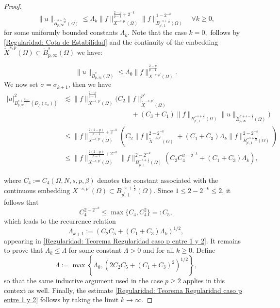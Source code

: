 \documentclass[]{amsart}
\theoremstyle{definition}
\theoremstyle{definition}
\theoremstyle{remark}
\numberwithin{equation}{section}
\begin{document}
\begin{proof}
		\begin{equation}
			\label{Regularidad: Teorema Regularidad caso p entre 1 y 2}
			\|u\|_{\dot{B}_{p, \infty}^{s+\frac{\sigma_{k}}{2}}(\Omega)} \leq \Lambda_{k}\|f\|_{X^{-s,p^{\prime}}(\Omega)}^{\frac{2-p}{p-1}+2^{-k}}\|f\|_{B_{p^{\prime}, 1}^{-s+\frac{1}{2}}(\Omega)}^{1-2^{-k}} \quad \forall k \ge 0,
		\end{equation}
		for some uniformly bounded constants \(\Lambda_{k}\).  Note that the case \(k=0,\) follows by \eqref{Regularidad: Cota de Estabilidad} and the continuity of the embedding \( \widetilde{X}^{s,p} (\Omega) \subset \dot{B}^{s}_{p,\infty} (\Omega) \)	 we have:
		
		\begin{equation*}
			\|u\|_{\dot{B}_{p, \infty}^{s}(\Omega)} \leq \Lambda_{0}\|f\|_{{X}^{-s,p^{\prime}}(\Omega)}^{\frac{2-p}{p-1}}.
		\end{equation*}
		We now set \(\sigma = \sigma_{k+1}\), then we have
		\begin{align*}
			|u|_{B_{p,\infty}^{s+\frac{\sigma_{k+1}}{2}}(D_\rho(x_0))}^{2} &\lesssim \|f\|_{X^{-s,p'}(\Omega)}^{\frac{2-p}{p-1}} \Bigg( C_2\|f\|^{p'}_{\widetilde{X}^{-s,p'}(\Omega)}  \\ & 
             \hspace{10em} +(C_3+C_1)\|f\|_{B_{p^{\prime}, 1}^{-s+\frac{1}{2}}\left(\Omega\right)}\|u\|_{\dot{B}_{p, \infty}^{\sigma+s-\frac{1}{2}}\left(\Omega\right)}\Bigg)\\
			& \leq \|f\|_{X^{-s,p'}(\Omega)}^{\frac{2(2-p)}{p-1}+2^{-k}} \left(C_2\|f\|^{2-2^{-k}}_{\widetilde{X}^{-s,p'}(\Omega)}+(C_{1}+C_3) \Lambda_{k}\|f\|_{B_{p^{\prime}, 1}^{-s+\frac{1}{2}}(\Omega)}^{2-2^{-k}}\right)\\
			&\leq \|f\|_{X^{-s,p'}(\Omega)}^{\frac{2(2-p)}{p-1}+2^{-k}}\|f\|_{B_{p^{\prime}, 1}^{-s+\frac{1}{2}}(\Omega)}^{2-2^{-k}} \left(C_2 C_4^{2-2^{-k}}+(C_1+C_3)\Lambda_{k}\right),
		\end{align*}
		
	\noindent where \( C_{4} := C_{4}(\Omega, N, s, p, \beta) \) denotes the constant associated with the continuous embedding \( X^{-s,p'}(\Omega) \subset B_{p^{\prime}, 1}^{-s+\frac{1}{2}}(\Omega) \). Since \( 1 \leq 2 - 2^{-k} \leq 2 \), it follows that
		\[
		C_{4}^{2 - 2^{-k}} \leq \max\{C_{4}, C_{4}^2\} =: C_{5},
		\]
	which leads to the recurrence relation
		\[
		\Lambda_{k+1} := \left(C_{2} C_{5} + (C_1 + C_3) \Lambda_k \right)^{1/2},
		\]
	appearing in \eqref{Regularidad: Teorema Regularidad caso p entre 1 y 2}. It remains to prove that \( \Lambda_k \leq \Lambda \) for some constant \( \Lambda > 0 \) and for all \( k \geq 0 \). Define
		\[
		\Lambda := \max\left\{ \Lambda_0, \left(2 C_2 C_5 + (C_1 + C_3)^2 \right)^{1/2} \right\},
		\]
	so that the same inductive argument used in the case \( p \geq 2 \) applies in this context as well. Finally, the estimate \eqref{Regularidad: Teorema Regularidad caso p entre 1 y 2} follows by taking the limit \( k \to \infty \). 
	\end{proof}
\end{document}
